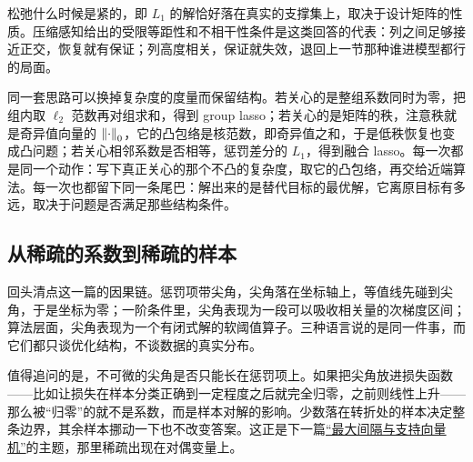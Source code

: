 松弛什么时候是紧的，即 \(L_1\) 的解恰好落在真实的支撑集上，取决于设计矩阵的性质。压缩感知给出的受限等距性和不相干性条件是这类回答的代表：列之间足够接近正交，恢复就有保证；列高度相关，保证就失效，退回上一节那种谁进模型都行的局面。

同一套思路可以换掉复杂度的度量而保留结构。若关心的是整组系数同时为零，把组内取 \(\ell_2\) 范数再对组求和，得到 group lasso；若关心的是矩阵的秩，注意秩就是奇异值向量的 \(\left\lVert\cdot\right\rVert_0\)，它的凸包络是核范数，即奇异值之和，于是低秩恢复也变成凸问题；若关心相邻系数是否相等，惩罚差分的 \(L_1\)，得到融合 lasso。每一次都是同一个动作：写下真正关心的那个不凸的复杂度，取它的凸包络，再交给近端算法。每一次也都留下同一条尾巴：解出来的是替代目标的最优解，它离原目标有多远，取决于问题是否满足那些结构条件。

\subsection{从稀疏的系数到稀疏的样本}

回头清点这一篇的因果链。惩罚项带尖角，尖角落在坐标轴上，等值线先碰到尖角，于是坐标为零；一阶条件里，尖角表现为一段可以吸收相关量的次梯度区间；算法层面，尖角表现为一个有闭式解的软阈值算子。三种语言说的是同一件事，而它们都只谈优化结构，不谈数据的真实分布。

值得追问的是，不可微的尖角是否只能长在惩罚项上。如果把尖角放进损失函数——比如让损失在样本分类正确到一定程度之后就完全归零，之前则线性上升——那么被``归零''的就不是系数，而是样本对解的影响。少数落在转折处的样本决定整条边界，其余样本挪动一下也不改变答案。这正是下一篇\hyperref[sec:09-Convex-Optimization/07-Applications/03]{``最大间隔与支持向量机''}的主题，那里稀疏出现在对偶变量上。
